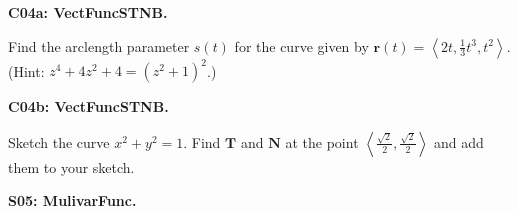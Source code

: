 \documentclass[12pt]{article}
\newcommand{\vect}{\mathbf}
\newcommand{\<}{\left\langle}
\renewcommand{\>}{\right\rangle}
\newcommand{\vecj}{\hat{\jmath}}
\newcommand{\exerciseHeader}[4]{


  \vspace{0.5em}
  \textbf{#2}
  \vspace{0.5em}

}
\begin{document}
\begin{multicols}{2}
%
%
%



\exerciseHeader{2017 June 15}{C04a: VectFuncSTNB.}{
Compute and apply the arclength parameter and TNB frame for a vector function.
}{1/4}

Find the arclength parameter \(s(t)\) for the curve given by
\(\vect r(t)=\<2t,\frac{1}{3}t^3,t^2\>\). (Hint: \(z^4+4z^2+4=(z^2+1)^2\).)

%

%

\exerciseHeader{2017 June 20}{C04b: VectFuncSTNB.}{
Compute and apply the arclength parameter and TNB frame for a vector function.
}{4/4}

Sketch the curve \(x^2+y^2=1\). Find \(\vect T\) and \(\vect N\)
at the point \(\<\frac{\sqrt 2}{2},\frac{\sqrt 2}{2}\>\) and add them to your
sketch.



\exerciseHeader{2017 June 16}{S05: MulivarFunc.}{
Sketch and analyze the domain, level curves, and graph of a two-variable
real-valued function.
}{1/3}


\end{multicols}
\end{document}
